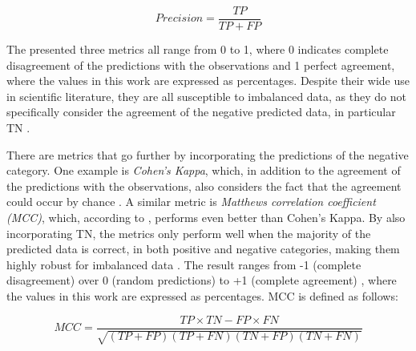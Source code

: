 \vspace{1\baselineskip}

\begin{equation}
Precision = \frac{TP}{TP + FP}
\end{equation}

\vspace{1\baselineskip}

The presented three metrics all range from 0 to 1, where 0 indicates complete disagreement of the predictions with the observations and 1 perfect agreement, where the values in this work are expressed as percentages. Despite their wide use in scientific literature, they are all susceptible to imbalanced data, as they do not specifically consider the agreement of the negative predicted data, in particular TN \parencite{chicco2020advantages}.

There are metrics that go further by incorporating the predictions of the negative category. One example is \textit{Cohen's Kappa}, which, in addition to the agreement of the predictions with the observations, also considers the fact that the agreement could occur by chance \parencite{cohen1960coefficient}. A similar metric is \textit{Matthews correlation coefficient (MCC)}, which, according to \textcite{chicco2021mcc}, performs even better than Cohen's Kappa. By also incorporating TN, the metrics only perform well when the majority of the predicted data is correct, in both positive and negative categories, making them highly robust for imbalanced data \parencite{chicco2020advantages, chicco2021mcc}. The result ranges from -1 (complete disagreement) over 0 (random predictions) to +1 (complete agreement) \parencite{baldi2015assessing}, where the values in this work are expressed as percentages. MCC is defined as follows:

\begin{equation}
MCC = \frac{TP \times TN-FP \times FN}{\sqrt{(TP+FP)(TP+FN)(TN+FP)(TN+FN)}}
\end{equation}